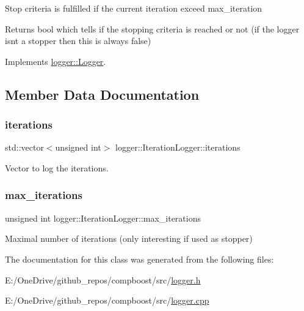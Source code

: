 Stop criteria is fulfilled if the current iteration exceed {\ttfamily max\+\_\+iteration} 

\begin{DoxyReturn}{Returns}
{\ttfamily bool} which tells if the stopping criteria is reached or not (if the logger isn\textquotesingle{}t a stopper then this is always false) 
\end{DoxyReturn}


Implements \mbox{\hyperlink{classlogger_1_1_logger_aed91421c07062b91cee158ef2bda7ae8}{logger\+::\+Logger}}.



\subsection{Member Data Documentation}
\mbox{\label{classlogger_1_1_iteration_logger_a7c9d7b0bd792a93a6dd5d9601a10a9b4}} 
\subsubsection{\texorpdfstring{iterations}{iterations}}
{\footnotesize\ttfamily std\+::vector$<$unsigned int$>$ logger\+::\+Iteration\+Logger\+::iterations\hspace{0.3cm}{\ttfamily [private]}}



Vector to log the iterations. 

\mbox{\label{classlogger_1_1_iteration_logger_a3fe389ce81d0790729b59b96414a3909}} 
\subsubsection{\texorpdfstring{max\+\_\+iterations}{max\_iterations}}
{\footnotesize\ttfamily unsigned int logger\+::\+Iteration\+Logger\+::max\+\_\+iterations\hspace{0.3cm}{\ttfamily [private]}}



Maximal number of iterations (only interesting if used as stopper) 



The documentation for this class was generated from the following files\+:\begin{DoxyCompactItemize}
\item 
E\+:/\+One\+Drive/github\+\_\+repos/compboost/src/\mbox{\hyperlink{logger_8h}{logger.\+h}}\item 
E\+:/\+One\+Drive/github\+\_\+repos/compboost/src/\mbox{\hyperlink{logger_8cpp}{logger.\+cpp}}\end{DoxyCompactItemize}
